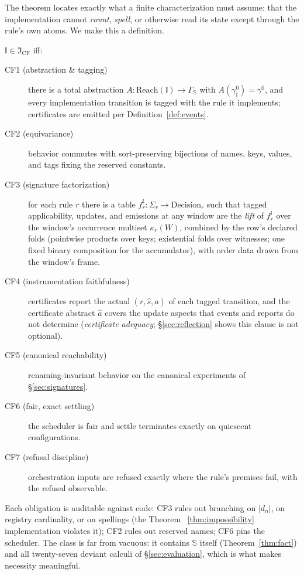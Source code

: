 \documentclass[sigplan,screen,review,nonacm]{acmart}
\newcommand{\Spec}{\ensuremath{\mathbb S}}
\newcommand{\Impl}{\ensuremath{\mathbb I}}
\newcommand{\CF}{\ensuremath{\mathfrak I_{\mathrm{CF}}}}
\newcommand{\occ}[1]{\ensuremath{\Sigma_{#1}}}
\newcommand{\kap}[1]{\ensuremath{\kappa_{#1}}}
\newcommand{\Reach}{\mathrm{Reach}}
\begin{document}
The theorem locates exactly what a finite characterization must assume: that
the implementation cannot \emph{count}, \emph{spell}, or otherwise read its
state except through the rule's own atoms. We make this a definition.

\begin{definition}\label{def:cf}
$\Impl \in \CF$ iff:
\begin{description}
\item[CF1 (abstraction \& tagging)] there is a total abstraction
  $A : \Reach(\Impl) \to \Gamma_\Spec$ with $A(\gamma^0_\Impl) = \gamma^0$, and
  every implementation transition is tagged with the rule it implements;
  certificates are emitted per Definition~\ref{def:events}.
\item[CF2 (equivariance)] behavior commutes with sort-preserving bijections of
  names, keys, values, and tags fixing the reserved constants.
\item[CF3 (signature factorization)] for each rule $r$ there is a table
  $f_r^{\Impl} : \occ r \to \mathrm{Decision}_r$ such that tagged applicability,
  updates, and emissions at any window are the \emph{lift} of $f_r^{\Impl}$
  over the window's occurrence multiset $\kap r(W)$, combined by the row's
  declared folds (pointwise products over keys; existential folds over
  witnesses; one fixed binary composition for the accumulator), with order data
  drawn from the window's frame.
\item[CF4 (instrumentation faithfulness)] certificates report the actual
  $(\!r, \widehat s, \widehat a)$ of each tagged transition, and the
  certificate abstract $\widehat a$ covers the update aspects that events and
  reports do not determine (\emph{certificate adequacy};
  \S\ref{sec:reflection} shows this clause is not optional).
\item[CF5 (canonical reachability)] renaming-invariant behavior on the
  canonical experiments of \S\ref{sec:signatures}.
\item[CF6 (fair, exact settling)] the scheduler is fair and settle terminates
  exactly on quiescent configurations.
\item[CF7 (refusal discipline)] orchestration inputs are refused exactly where
  the rule's premises fail, with the refusal observable.
\end{description}
\end{definition}

Each obligation is auditable against code: CF3 rules out branching on
$|d_n|$, on registry cardinality, or on spellings (the Theorem~%
\ref{thm:impossibility} implementation violates it); CF2 rules out reserved
names; CF6 pins the scheduler. The class is far from vacuous: it contains
\Spec{} itself (Theorem~\ref{thm:fact}) and all twenty-seven deviant calculi of
\S\ref{sec:evaluation}, which is what makes necessity meaningful.
\end{document}
